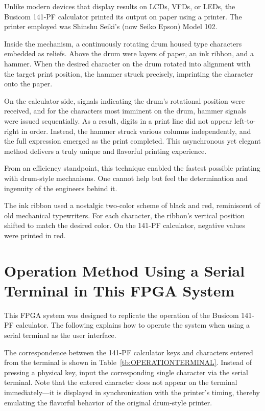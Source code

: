 Unlike modern devices that display results on LCDs, VFDs, or LEDs, the Busicom 141-PF calculator printed its output on paper using a printer. The printer employed was Shinshu Seiki’s (now Seiko Epson) Model 102.

Inside the mechanism, a continuously rotating drum housed type characters embedded as reliefs. Above the drum were layers of paper, an ink ribbon, and a hammer. When the desired character on the drum rotated into alignment with the target print position, the hammer struck precisely, imprinting the character onto the paper.

On the calculator side, signals indicating the drum's rotational position were received, and for the characters most imminent on the drum, hammer signals were issued sequentially. As a result, digits in a print line did not appear left-to-right in order. Instead, the hammer struck various columns independently, and the full expression emerged as the print completed. This asynchronous yet elegant method delivers a truly unique and flavorful printing experience.

From an efficiency standpoint, this technique enabled the fastest possible printing with drum-style mechanisms. One cannot help but feel the determination and ingenuity of the engineers behind it.

The ink ribbon used a nostalgic two-color scheme of black and red, reminiscent of old mechanical typewriters. For each character, the ribbon's vertical position shifted to match the desired color. On the 141-PF calculator, negative values were printed in red.

\section{Operation Method Using a Serial Terminal in This FPGA System}

This FPGA system was designed to replicate the operation of the Busicom 141-PF calculator. The following explains how to operate the system when using a serial terminal as the user interface.

The correspondence between the 141-PF calculator keys and characters entered from the terminal is shown in Table~\ref{tb:OPERATIONTERMINAL}. Instead of pressing a physical key, input the corresponding single character via the serial terminal. Note that the entered character does not appear on the terminal immediately—it is displayed in synchronization with the printer's timing, thereby emulating the flavorful behavior of the original drum-style printer.


